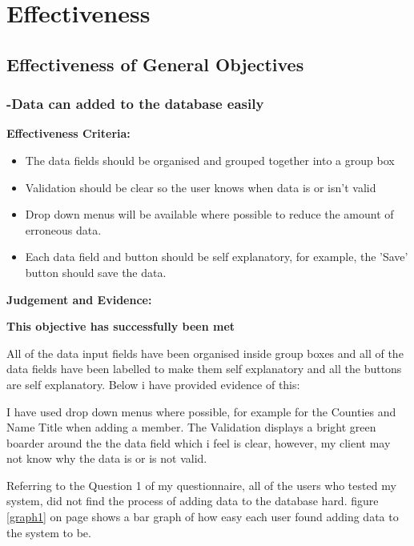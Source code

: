 \pagebreak
\section{Effectiveness}

\subsection{Effectiveness of General Objectives}

\vspace{10mm}

\subsubsection{-Data can added to the database easily}

\textbf{Effectiveness Criteria:}\newline
\begin{itemize}
	\item{The data fields should be organised and grouped together into a group box}
	\item{Validation should be clear so the user knows when data is or isn't valid}
	\item{Drop down menus will be available where possible to reduce the amount of erroneous data.}
	\item{Each data field and button should be self explanatory, for example, the 'Save' button should save the data.}
\end{itemize}
\textbf{Judgement and Evidence:} \newline

\textbf{\large{This objective has successfully been met}}

All of the data input fields have been organised inside group boxes and all of the data fields have been labelled to make them self explanatory and all the buttons are self explanatory. Below i have provided evidence of this:

I have used drop down menus where possible, for example for the Counties and Name Title when adding a member. The Validation displays a bright green boarder around the the data field which i feel is clear, however, my client may not know why the data is or is not valid.

Referring to the Question 1 of my questionnaire, all of the users who tested my system, did not find the process of adding data to the database hard. figure \ref{graph1} on page \pageref{Graph1} shows a bar graph of how easy each user found adding data to the system to be.

